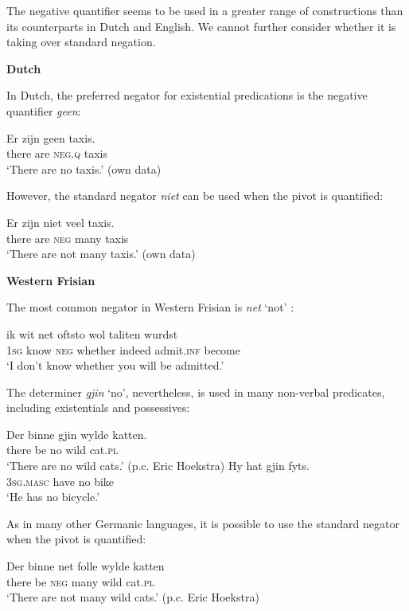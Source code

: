 ﻿\documentclass[output=paper]{langsci/langscibook}
\begin{document}
\begin{unindented}
The negative quantifier seems to be used in a greater range of constructions than its counterparts in Dutch and English. We cannot further consider  whether it is taking over standard negation. 

\textbf{Dutch} 

In Dutch, the preferred negator for existential predications is the negative quantifier \textit{geen}: 
%
\begin{exe}\ex
\gll Er zijn geen   taxis. \\
there are \textsc{neg.q} taxis \\
    \glt `There are no taxis.' (own data)
    \end{exe}

However, the standard negator \textit{niet} can be used when the pivot is quantified:
%
\begin{exe}\ex \gll Er zijn niet  veel   taxis. \\
there are  \textsc{neg} many taxis \\
    \glt `There are not many taxis.' (own data)
    \end{exe}

\textbf{Western Frisian}

The most common negator in Western Frisian is \textit{net} `not' \citep[102--103]{Tiersma1999}:
%
\begin{exe}\ex \gll ik wit net  oftsto wol taliten wurdst \\
\textsc{1sg} know \textsc{neg} whether indeed admit.\textsc{inf} become \\
    \glt `I don't know whether you will be admitted.' \citep[91]{Tiersma1999}
    \end{exe}

The determiner \textit{gjin} `no', nevertheless, is used in many non-verbal predicates, including existentials and possessives:
%
\begin{exe}\ex \gll Der binne gjin wylde katten. \\
there be no wild cat.\textsc{pl}
        \\
    \glt `There are no wild cats.' (p.c. Eric Hoekstra) 
\ex \gll Hy hat gjin fyts. \\
\textsc{3sg.masc} have no   bike \\
    \glt `He has no bicycle.' \citep[102]{Tiersma1999}
    \end{exe}

As in many other Germanic languages, it is possible to use the standard negator when the pivot is quantified:
%
\begin{exe}\ex \gll Der   binne net   folle  wylde katten \\
there be \textsc{neg} many wild   cat.\textsc{pl} \\
    \glt `There are not many wild cats.' (p.c. Eric Hoekstra)
    \end{exe}


\end{unindented}
\end{document}
